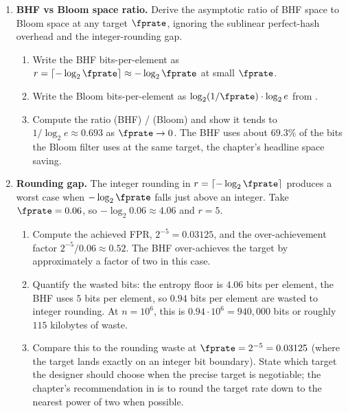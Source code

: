 \begin{enumerate}
\item \exstarstar
\label{ex:ch14-5}
\textbf{BHF vs Bloom space ratio.}
Derive the asymptotic ratio of BHF space to Bloom space at any
target $\fprate$, ignoring the sublinear perfect-hash overhead and
the integer-rounding gap.
\begin{enumerate}
  \item[(a)] Write the BHF bits-per-element as $r =
    \lceil -\log_2 \fprate \rceil \approx -\log_2 \fprate$ at small
    $\fprate$.
  \item[(b)] Write the Bloom bits-per-element as
    $\log_2(1/\fprate) \cdot \log_2 e$ from
    .
  \item[(c)] Compute the ratio (BHF) / (Bloom) and show it tends
    to $1 / \log_2 e \approx 0.693$ as $\fprate \to 0$. The BHF
    uses about $69.3\%$ of the bits the Bloom filter uses at the
    same target, the chapter's headline space saving.
\end{enumerate}

\item \exstarstar
\label{ex:ch14-6}
\textbf{Rounding gap.}
The integer rounding in $r = \lceil -\log_2 \fprate \rceil$
produces a worst case when $-\log_2 \fprate$ falls just above an
integer. Take $\fprate = 0.06$, so $-\log_2 0.06 \approx 4.06$ and
$r = 5$.
\begin{enumerate}
  \item[(a)] Compute the achieved FPR, $2^{-5} = 0.03125$, and the
    over-achievement factor $2^{-5} / 0.06 \approx 0.52$. The
    BHF over-achieves the target by approximately a factor of two
    in this case.
  \item[(b)] Quantify the wasted bits: the entropy floor is $4.06$
    bits per element, the BHF uses $5$ bits per element, so $0.94$
    bits per element are wasted to integer rounding. At $n = 10^6$,
    this is $0.94 \cdot 10^6 = 940{,}000$ bits or roughly $115$
    kilobytes of waste.
  \item[(c)] Compare this to the rounding waste at $\fprate =
    2^{-5} = 0.03125$ (where the target lands exactly on an integer
    bit boundary). State which target the designer should choose
    when the precise target is negotiable; the chapter's
    recommendation in  is to round the
    target rate down to the nearest power of two when possible.
\end{enumerate}


\end{enumerate}
